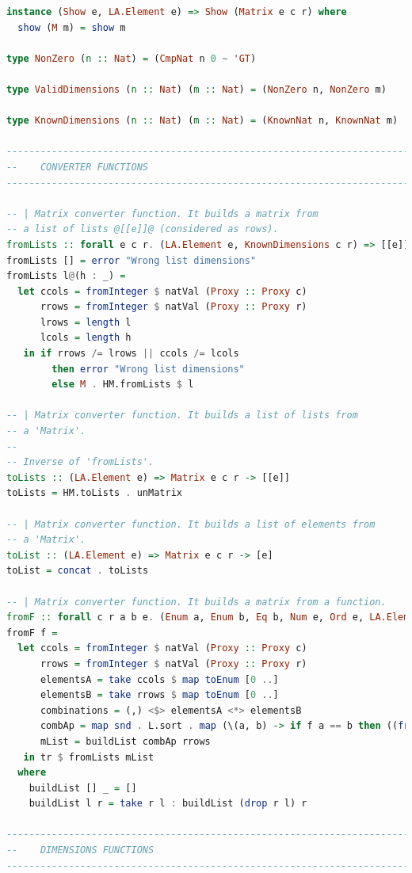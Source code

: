 \documentclass[
  oneside,
  11pt, a4paper,
  footinclude=true,
  headinclude=true,
  cleardoublepage=empty
]{scrbook}
\theoremstyle{definition}
\theoremstyle{definition}
\begin{document}
\begin{lstlisting}[language=Haskell, caption={Type safe matrix wrapper library},captionpos=b]
instance (Show e, LA.Element e) => Show (Matrix e c r) where
  show (M m) = show m

type NonZero (n :: Nat) = (CmpNat n 0 ~ 'GT)

type ValidDimensions (n :: Nat) (m :: Nat) = (NonZero n, NonZero m)

type KnownDimensions (n :: Nat) (m :: Nat) = (KnownNat n, KnownNat m)

-------------------------------------------------------------------------------
--    CONVERTER FUNCTIONS
-------------------------------------------------------------------------------

-- | Matrix converter function. It builds a matrix from
-- a list of lists @[[e]]@ (considered as rows).
fromLists :: forall e c r. (LA.Element e, KnownDimensions c r) => [[e]] -> Matrix e c r
fromLists [] = error "Wrong list dimensions"
fromLists l@(h : _) =
  let ccols = fromInteger $ natVal (Proxy :: Proxy c)
      rrows = fromInteger $ natVal (Proxy :: Proxy r)
      lrows = length l
      lcols = length h
   in if rrows /= lrows || ccols /= lcols
        then error "Wrong list dimensions"
        else M . HM.fromLists $ l

-- | Matrix converter function. It builds a list of lists from
-- a 'Matrix'.
--
-- Inverse of 'fromLists'.
toLists :: (LA.Element e) => Matrix e c r -> [[e]]
toLists = HM.toLists . unMatrix

-- | Matrix converter function. It builds a list of elements from
-- a 'Matrix'.
toList :: (LA.Element e) => Matrix e c r -> [e]
toList = concat . toLists

-- | Matrix converter function. It builds a matrix from a function.
fromF :: forall c r a b e. (Enum a, Enum b, Eq b, Num e, Ord e, LA.Element e, KnownNat c, KnownNat r) => (a -> b) -> Matrix e c r
fromF f =
  let ccols = fromInteger $ natVal (Proxy :: Proxy c)
      rrows = fromInteger $ natVal (Proxy :: Proxy r)
      elementsA = take ccols $ map toEnum [0 ..]
      elementsB = take rrows $ map toEnum [0 ..]
      combinations = (,) <$> elementsA <*> elementsB
      combAp = map snd . L.sort . map (\(a, b) -> if f a == b then ((fromEnum a, fromEnum b), 1) else ((fromEnum a, fromEnum b), 0)) $ combinations
      mList = buildList combAp rrows
   in tr $ fromLists mList
  where
    buildList [] _ = []
    buildList l r = take r l : buildList (drop r l) r

-------------------------------------------------------------------------------
--    DIMENSIONS FUNCTIONS
-------------------------------------------------------------------------------


\end{lstlisting}
\end{document}
